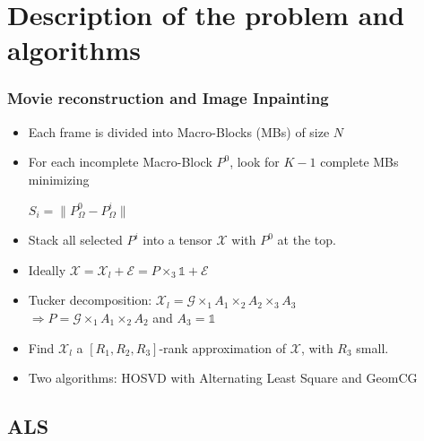 \documentclass{beamer}
\begin{document}
\begin{frame}[fragile]
\end{frame}

\section{Description of the problem and algorithms} 
\begin{frame}
\frametitle{Movie reconstruction and Image Inpainting}
\begin{itemize}
\item Each frame is divided into Macro-Blocks (MBs) of size $N$ 
\item For each incomplete Macro-Block $P^0$, look for $K-1$ complete MBs minimizing\\
\begin{center} $S_i=\| P^0_{\Omega}-P^i_{\Omega}\|$ \end{center}
\item Stack all selected $P^i$ into a tensor $\mathcal{X}$ with $P^0$ at the top.
\item Ideally $\mathcal{X}=\mathcal{X}_l+\mathcal{E}=P\times_3\mathds{1}+\mathcal{E}$\\
\item Tucker decomposition: $\mathcal{X}_l=\mathcal{G}\times_1 A_1\times_2 A_2\times_3 A_3$\\
$\Rightarrow P=\mathcal{G}\times_1 A_1\times_2 A_2$ and $A_3=\mathds{1}$
\item Find $\mathcal{X}_l$ a $[R_1,R_2,R_3]$-rank approximation of $\mathcal{X}$, with $R_3$ small.
\item Two algorithms: HOSVD with Alternating Least Square and GeomCG
\end{itemize}


\end{frame}

\subsection{ALS}
\end{document}
